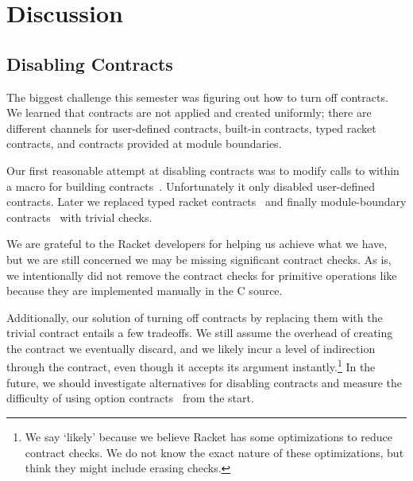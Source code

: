\newpage
\section{Discussion}
\label{discussion}

\subsection{Disabling Contracts}
\label{disabling-contracts}

The biggest challenge this semester was figuring out how to turn off contracts.
We learned that contracts are not applied and created uniformly; there are different channels for user-defined contracts, built-in contracts, typed racket contracts, and contracts provided at module boundaries.

Our first reasonable attempt at disabling contracts was to modify calls to  within a macro for building contracts~\cite{no-contracts1}.
Unfortunately it only disabled user-defined contracts.
Later we replaced typed racket contracts~\cite{no-contracts2} and finally module-boundary contracts~\cite{no-contracts3} with trivial checks.

We are grateful to the Racket developers for helping us achieve what we have, but we are still concerned we may be missing significant contract checks.
As is, we intentionally did not remove the contract checks for primitive operations like \mono{+} because they are implemented manually in the C source.

Additionally, our solution of turning off contracts by replacing them with the trivial  contract entails a few tradeoffs.
We still assume the overhead of creating the contract we eventually discard, and we likely incur a level of indirection through the  contract, even though it accepts its argument instantly.\footnote{We say `likely' because we believe Racket has some optimizations to reduce contract checks. We do not know the exact nature of these optimizations, but think they might include erasing  checks.}
In the future, we should investigate alternatives for disabling contracts and measure the difficulty of using option contracts~\cite{option-contracts} from the start.
